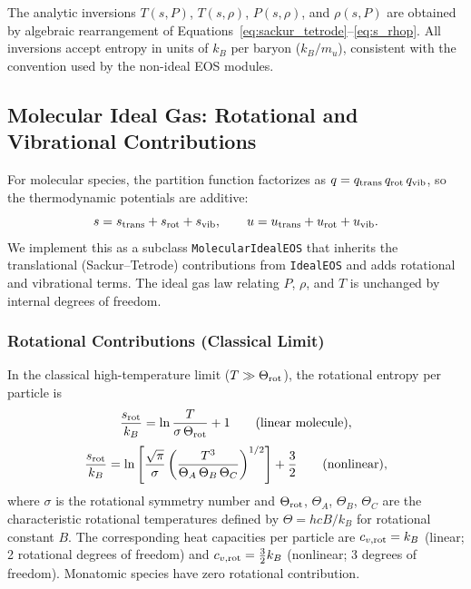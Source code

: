 \documentclass[twocolumn]{aastex701}
\begin{document}
The analytic inversions $T(s,P)$, $T(s,\rho)$, $P(s,\rho)$, and $\rho(s,P)$ are obtained by algebraic rearrangement of Equations~\eqref{eq:sackur_tetrode}--\eqref{eq:s_rhop}.
All inversions accept entropy in units of $k_B$ per baryon ($k_B / m_u$), consistent with the convention used by the non-ideal EOS modules.

\subsection{Molecular Ideal Gas: Rotational and Vibrational Contributions}\label{sec:molecular_eos}

For molecular species, the partition function factorizes as $q = q_{\rm trans}\, q_{\rm rot}\, q_{\rm vib}$, so the thermodynamic potentials are additive:
\begin{equation}
    s = s_{\rm trans} + s_{\rm rot} + s_{\rm vib}, \qquad u = u_{\rm trans} + u_{\rm rot} + u_{\rm vib}.
\end{equation}
We implement this as a subclass \texttt{MolecularIdealEOS} that inherits the translational (Sackur--Tetrode) contributions from \texttt{IdealEOS} and adds rotational and vibrational terms.
The ideal gas law relating $P$, $\rho$, and $T$ is unchanged by internal degrees of freedom.

\subsubsection{Rotational Contributions (Classical Limit)}\label{sec:rot}

In the classical high-temperature limit ($T \gg \Theta_{\rm rot}$), the rotational entropy per particle is
\begin{equation}\label{eq:s_rot_lin}
    \frac{s_{\rm rot}}{k_B} = \ln\frac{T}{\sigma\,\Theta_{\rm rot}} + 1 \qquad (\text{linear molecule}),
\end{equation}
\begin{equation}\label{eq:s_rot_nonlin}
    \frac{s_{\rm rot}}{k_B} = \ln\left[\frac{\sqrt{\pi}}{\sigma}\left(\frac{T^3}{\Theta_A\,\Theta_B\,\Theta_C}\right)^{1/2}\right] + \frac{3}{2} \qquad (\text{nonlinear}),
\end{equation}
where $\sigma$ is the rotational symmetry number and $\Theta_{\rm rot}$, $\Theta_A$, $\Theta_B$, $\Theta_C$ are the characteristic rotational temperatures defined by $\Theta = hcB/k_B$ for rotational constant $B$.
The corresponding heat capacities per particle are $c_{v,\rm rot} = k_B$ (linear; 2 rotational degrees of freedom) and $c_{v,\rm rot} = \frac{3}{2}k_B$ (nonlinear; 3 degrees of freedom).
Monatomic species have zero rotational contribution.
\end{document}
